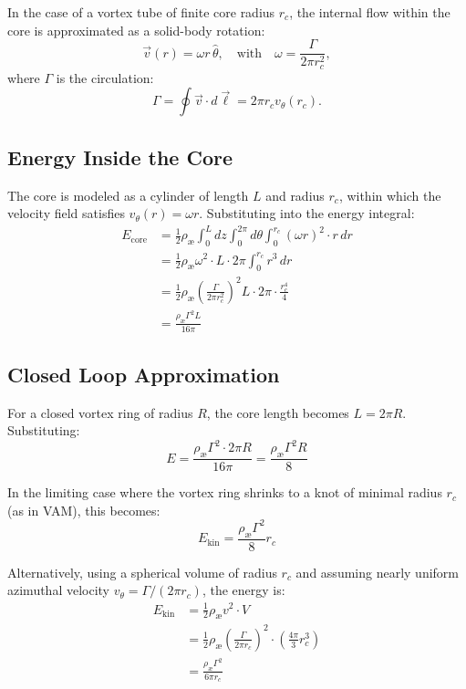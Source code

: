 \documentclass[12pt]{article}
\begin{document}
In the case of a vortex tube of finite core radius $r_c$, the internal flow within the core is approximated as a solid-body rotation:
\begin{equation}
    \vec{v}(r) = \omega r \, \hat{\theta}, \quad \text{with} \quad \omega = \frac{\Gamma}{2\pi r_c^2},
\end{equation}
where $\Gamma$ is the circulation:
\begin{equation}
    \Gamma = \oint \vec{v} \cdot d\vec{\ell} = 2\pi r_c v_\theta(r_c).
\end{equation}

\subsection{Energy Inside the Core}
The core is modeled as a cylinder of length $L$ and radius $r_c$, within which the velocity field satisfies $v_\theta(r) = \omega r$. Substituting into the energy integral:
\begin{align}
    E_\text{core} &= \frac{1}{2} \rho_\text{\ae} \int_0^L dz \int_0^{2\pi} d\theta \int_0^{r_c} (\omega r)^2 \cdot r \, dr \\
    &= \frac{1}{2} \rho_\text{\ae} \omega^2 \cdot L \cdot 2\pi \int_0^{r_c} r^3 \, dr \\
    &= \frac{1}{2} \rho_\text{\ae} \left(\frac{\Gamma}{2\pi r_c^2}\right)^2 L \cdot 2\pi \cdot \frac{r_c^4}{4} \\
    &= \frac{\rho_\text{\ae} \Gamma^2 L}{16\pi}
\end{align}

\subsection{Closed Loop Approximation}
For a closed vortex ring of radius $R$, the core length becomes $L = 2\pi R$. Substituting:
\begin{equation}
    E = \frac{\rho_\text{\ae} \Gamma^2 \cdot 2\pi R}{16\pi} = \frac{\rho_\text{\ae} \Gamma^2 R}{8}
\end{equation}

In the limiting case where the vortex ring shrinks to a knot of minimal radius $r_c$ (as in VAM), this becomes:
\begin{equation}
    E_\text{kin} = \frac{\rho_\text{\ae} \Gamma^2}{8} r_c
\end{equation}

Alternatively, using a spherical volume of radius $r_c$ and assuming nearly uniform azimuthal velocity $v_\theta = \Gamma / (2\pi r_c)$, the energy is:
\begin{align}
    E_\text{kin} &= \frac{1}{2} \rho_\text{\ae} v^2 \cdot V \\
    &= \frac{1}{2} \rho_\text{\ae} \left( \frac{\Gamma}{2\pi r_c} \right)^2 \cdot \left( \frac{4\pi}{3} r_c^3 \right) \\
    &= \boxed{\frac{\rho_\text{\ae} \Gamma^2}{6\pi r_c}}
\end{align}
\end{document}

